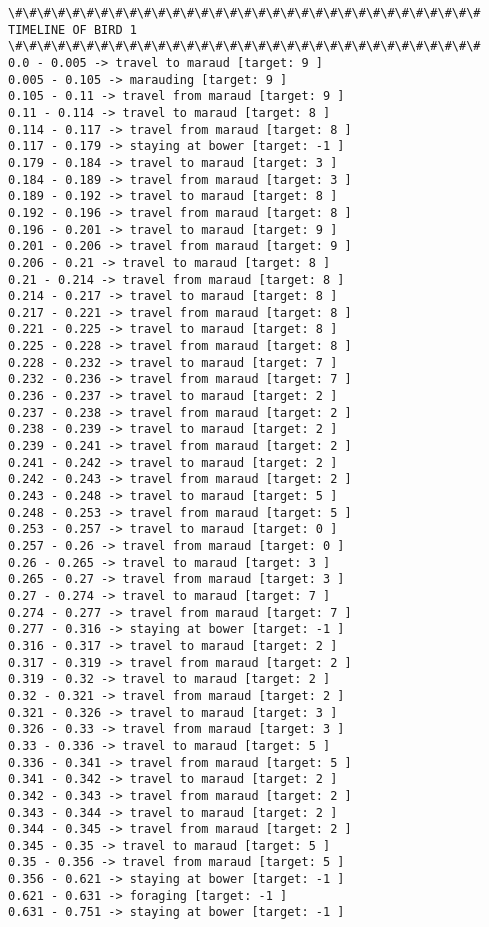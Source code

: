 \documentclass[11pt]{article}
\begin{document}
\begin{Verbatim}[commandchars=\\\{\}]
\#\#\#\#\#\#\#\#\#\#\#\#\#\#\#\#\#\#\#\#\#\#\#\#\#\#\#\#\#\#\#\#\#
TIMELINE OF BIRD 1
\#\#\#\#\#\#\#\#\#\#\#\#\#\#\#\#\#\#\#\#\#\#\#\#\#\#\#\#\#\#\#\#\#
0.0 - 0.005 -> travel to maraud [target: 9 ]
0.005 - 0.105 -> marauding [target: 9 ]
0.105 - 0.11 -> travel from maraud [target: 9 ]
0.11 - 0.114 -> travel to maraud [target: 8 ]
0.114 - 0.117 -> travel from maraud [target: 8 ]
0.117 - 0.179 -> staying at bower [target: -1 ]
0.179 - 0.184 -> travel to maraud [target: 3 ]
0.184 - 0.189 -> travel from maraud [target: 3 ]
0.189 - 0.192 -> travel to maraud [target: 8 ]
0.192 - 0.196 -> travel from maraud [target: 8 ]
0.196 - 0.201 -> travel to maraud [target: 9 ]
0.201 - 0.206 -> travel from maraud [target: 9 ]
0.206 - 0.21 -> travel to maraud [target: 8 ]
0.21 - 0.214 -> travel from maraud [target: 8 ]
0.214 - 0.217 -> travel to maraud [target: 8 ]
0.217 - 0.221 -> travel from maraud [target: 8 ]
0.221 - 0.225 -> travel to maraud [target: 8 ]
0.225 - 0.228 -> travel from maraud [target: 8 ]
0.228 - 0.232 -> travel to maraud [target: 7 ]
0.232 - 0.236 -> travel from maraud [target: 7 ]
0.236 - 0.237 -> travel to maraud [target: 2 ]
0.237 - 0.238 -> travel from maraud [target: 2 ]
0.238 - 0.239 -> travel to maraud [target: 2 ]
0.239 - 0.241 -> travel from maraud [target: 2 ]
0.241 - 0.242 -> travel to maraud [target: 2 ]
0.242 - 0.243 -> travel from maraud [target: 2 ]
0.243 - 0.248 -> travel to maraud [target: 5 ]
0.248 - 0.253 -> travel from maraud [target: 5 ]
0.253 - 0.257 -> travel to maraud [target: 0 ]
0.257 - 0.26 -> travel from maraud [target: 0 ]
0.26 - 0.265 -> travel to maraud [target: 3 ]
0.265 - 0.27 -> travel from maraud [target: 3 ]
0.27 - 0.274 -> travel to maraud [target: 7 ]
0.274 - 0.277 -> travel from maraud [target: 7 ]
0.277 - 0.316 -> staying at bower [target: -1 ]
0.316 - 0.317 -> travel to maraud [target: 2 ]
0.317 - 0.319 -> travel from maraud [target: 2 ]
0.319 - 0.32 -> travel to maraud [target: 2 ]
0.32 - 0.321 -> travel from maraud [target: 2 ]
0.321 - 0.326 -> travel to maraud [target: 3 ]
0.326 - 0.33 -> travel from maraud [target: 3 ]
0.33 - 0.336 -> travel to maraud [target: 5 ]
0.336 - 0.341 -> travel from maraud [target: 5 ]
0.341 - 0.342 -> travel to maraud [target: 2 ]
0.342 - 0.343 -> travel from maraud [target: 2 ]
0.343 - 0.344 -> travel to maraud [target: 2 ]
0.344 - 0.345 -> travel from maraud [target: 2 ]
0.345 - 0.35 -> travel to maraud [target: 5 ]
0.35 - 0.356 -> travel from maraud [target: 5 ]
0.356 - 0.621 -> staying at bower [target: -1 ]
0.621 - 0.631 -> foraging [target: -1 ]
0.631 - 0.751 -> staying at bower [target: -1 ]

\end{Verbatim}
\end{document}
